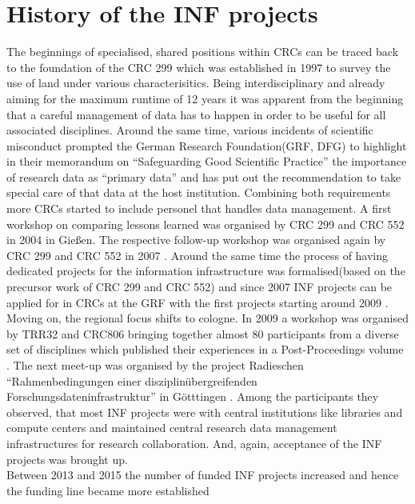 \documentclass{eceasst}
\begin{document}
\section{History of the INF projects}
The beginnings of specialised, shared positions within CRCs can be traced back to the foundation of the CRC 299 which was established in 1997 to survey the use of land under various characterisitics. Being interdisciplinary and already aiming for the maximum runtime of 12 years it was apparent from the beginning \cite{mueckschel2006} that a careful
management of data has to happen in order to be useful for all associated disciplines.
Around the same time, various incidents of scientific misconduct prompted the German Research Foundation(GRF, DFG) to highlight in their
memorandum on ``Safeguarding Good Scientific Practice'' \cite{DFG1998}
the importance of research data as ``primary data''  and has put out the recommendation to take special care
of that data at the host institution.
Combining both requirements more CRCs started to include personel that handles data management.
A first workshop \cite{SFB299-2004, SFB299-2005} on comparing lessons learned was organised by CRC 299 and CRC 552 in 2004 in Gießen.
The respective follow-up workshop was organised again by CRC 299 and CRC 552 in 2007 \cite{SFB299-2007}.
Around the same time the process of having dedicated projects for the information infrastructure was formalised(based on the precursor work of CRC 299 and CRC 552)
and since 2007 INF projects can be applied for in CRCs at the GRF with the first projects starting around 2009 \cite{Forschungsdateninfrastruktur2013}.
Moving on, the regional focus shifts to cologne.
In 2009 a workshop was organised by TRR32 and CRC806
bringing together almost 80 participants from a diverse set of disciplines which published their experiences in a
Post-Proceedings volume \cite{curdt787}.
The next meet-up was organised by the project Radieschen
``Rahmenbedingungen einer disziplinübergreifenden Forschungsdateninfrastruktur''
in Götttingen \cite{Forschungsdateninfrastruktur2013}. Among the participants they observed,
that most INF projects were with central institutions like libraries and compute centers and maintained central
research data management infrastructures for research collaboration. And, again, acceptance of the INF projects was brought up.\\
Between 2013 and 2015 the number of funded INF projects increased and hence the funding line became more established \cite{Engelhardt2013Forschungsdatenmanagement, bastian_2025}
\end{document}
